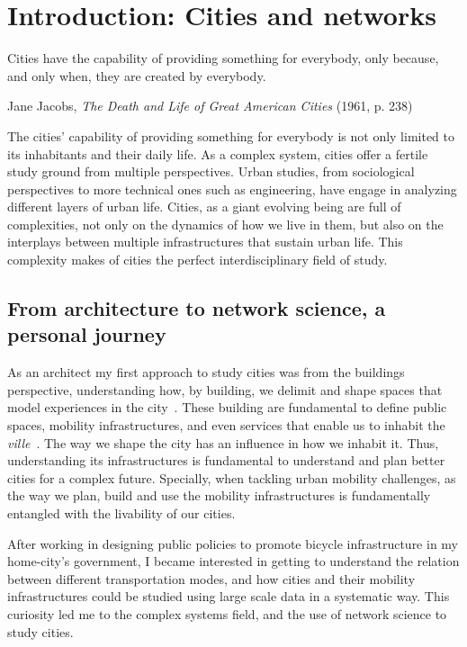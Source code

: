\chapter{Introduction: Cities and networks}

\epigraph{Cities have the capability of providing something for everybody, only because, and only when, they are created by everybody.}{Jane Jacobs, \textit{The Death and Life of Great American Cities} (1961, p. 238)}

The cities' capability of providing something for everybody is not only limited to its inhabitants and their daily life. As a complex system, cities offer a fertile study ground from multiple perspectives. Urban studies, from sociological perspectives to more technical ones such as engineering, have engage in analyzing different layers of urban life. Cities, as a giant evolving being are full of complexities, not only on the dynamics of how we live in them, but also on the interplays between multiple infrastructures that sustain urban life. This complexity makes of cities the perfect interdisciplinary field of study.

\section{From architecture to network science, a personal journey}

As an architect my first approach to study cities was from the buildings perspective, understanding how, by building, we delimit and shape spaces that model experiences in the city~\cite{ghel1971life}. These building are fundamental to define public spaces, mobility infrastructures, and even services that enable us to inhabit the \textit{ville}~\cite{sennett2018building}. The way we shape the city has an influence in how we inhabit it. Thus, understanding its infrastructures is fundamental to understand and plan better cities for a complex future. Specially, when tackling urban mobility challenges, as the way we plan, build and use the mobility infrastructures is fundamentally entangled with the livability of our cities.

After working in designing public policies to promote bicycle infrastructure in my home-city's government, I became interested in getting to understand the relation between different transportation modes, and how cities and their mobility infrastructures could be studied using large scale data in a systematic way. This curiosity led me to the complex systems field, and the use of network science to study cities.

